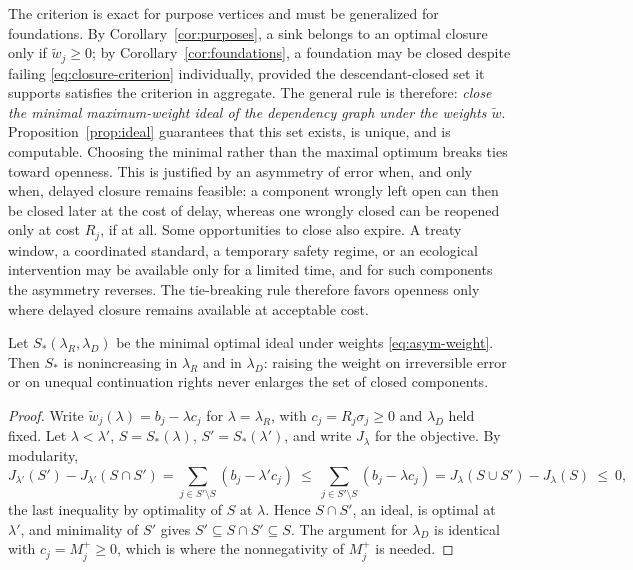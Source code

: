 The criterion is exact for purpose vertices and must be generalized for foundations. By Corollary~\ref{cor:purposes}, a sink belongs to an optimal closure only if $\tilde w_j\geq 0$; by Corollary~\ref{cor:foundations}, a foundation may be closed despite failing \eqref{eq:closure-criterion} individually, provided the descendant-closed set it supports satisfies the criterion in aggregate. The general rule is therefore: \emph{close the minimal maximum-weight ideal of the dependency graph under the weights $\tilde w$}. Proposition~\ref{prop:ideal} guarantees that this set exists, is unique, and is computable. Choosing the minimal rather than the maximal optimum breaks ties toward openness. This is justified by an asymmetry of error when, and only when, delayed closure remains feasible: a component wrongly left open can then be closed later at the cost of delay, whereas one wrongly closed can be reopened only at cost $R_j$, if at all. Some opportunities to close also expire. A treaty window, a coordinated standard, a temporary safety regime, or an ecological intervention may be available only for a limited time, and for such components the asymmetry reverses. The tie-breaking rule therefore favors openness only where delayed closure remains available at acceptable cost.

\begin{proposition}\label{prop:comparative}
Let $S_\ast(\lambda_R,\lambda_D)$ be the minimal optimal ideal under weights \eqref{eq:asym-weight}. Then $S_\ast$ is nonincreasing in $\lambda_R$ and in $\lambda_D$: raising the weight on irreversible error or on unequal continuation rights never enlarges the set of closed components.
\end{proposition}

\begin{proof}
Write $\tilde w_j(\lambda)=b_j-\lambda c_j$ for $\lambda=\lambda_R$, with $c_j=R_j\sigma_j\geq 0$ and $\lambda_D$ held fixed. Let $\lambda<\lambda'$, $S=S_\ast(\lambda)$, $S'=S_\ast(\lambda')$, and write $J_\lambda$ for the objective. By modularity,
\[
J_{\lambda'}(S')-J_{\lambda'}(S\cap S')=\sum_{j\in S'\setminus S}(b_j-\lambda'c_j)\ \leq\ \sum_{j\in S'\setminus S}(b_j-\lambda c_j)=J_\lambda(S\cup S')-J_\lambda(S)\ \leq\ 0,
\]
the last inequality by optimality of $S$ at $\lambda$. Hence $S\cap S'$, an ideal, is optimal at $\lambda'$, and minimality of $S'$ gives $S'\subseteq S\cap S'\subseteq S$. The argument for $\lambda_D$ is identical with $c_j=M_j^+\geq 0$, which is where the nonnegativity of $M_j^+$ is needed.
\end{proof}

